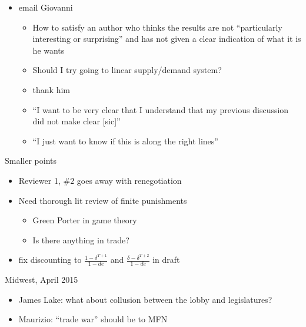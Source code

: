 \documentclass[12pt]{article}
\newcommand{\de}{\delta}
\begin{document}
\begin{itemize}
	\item email Giovanni
		\begin{itemize}
			\item How to satisfy an author who thinks the results are not ``particularly interesting or surprising'' and has not given a clear indication of what it is he wants
			\item Should I try going to linear supply/demand system?
			\item thank him
			\item ``I want to be very clear that I understand that my previous discussion did not make clear [sic]''
			\item ``I just want to know if this is along the right lines''
		\end{itemize}
\end{itemize}

\vskip1in
Smaller points
\begin{itemize}
	\item Reviewer 1, $\#2$ goes away with renegotiation
	\item Need thorough lit review of finite punishments
		\begin{itemize}
			\item Green Porter in game theory
			\item Is there anything in trade?
		\end{itemize}
	\item fix discounting to $\frac{1 - \de^{T+1}}{1-de}$ and $\frac{\de - \de^{T+2}}{1-de}$ in draft
\end{itemize}


\vskip1in
Midwest, April 2015
\begin{itemize}
	\item James Lake: what about collusion between the lobby and legislatures?
	\item Maurizio: ``trade war'' should be to MFN
\end{itemize}
\end{document}
